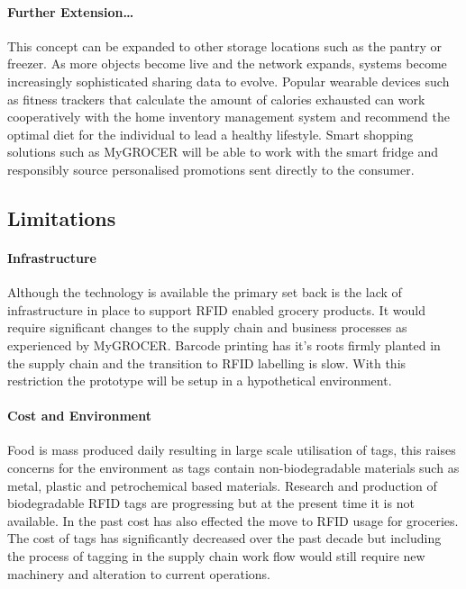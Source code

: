 \documentclass[a4paper, 11pt]{article}
\begin{document}
{\paragraph{Further Extension\dots} This concept can be expanded to other storage locations such as the pantry or freezer. As more objects become live and the network expands, systems become increasingly sophisticated sharing data to evolve. Popular wearable devices such as fitness trackers that calculate the amount of calories exhausted can work cooperatively with the home inventory management system and recommend the optimal diet for the individual to lead a healthy lifestyle. Smart shopping solutions such as MyGROCER\cite{myGrocer} will be able to work with the smart fridge and responsibly source personalised promotions sent directly to the consumer.

\vspace{\baselineskip}
\vspace{\baselineskip}
\vspace{\baselineskip}

\subsection{Limitations}

\paragraph{Infrastructure}Although the technology is available the primary set back is the lack of infrastructure in place to support RFID enabled grocery products. It would require significant changes to the supply chain and business processes \cite{pervasiveComp} as experienced by MyGROCER. Barcode printing has it's roots firmly planted in the supply chain and the transition to RFID labelling is slow. With this restriction the prototype will be setup in a hypothetical environment.

\paragraph{Cost and Environment}Food is mass produced daily resulting in large scale utilisation of tags, this raises concerns for the environment as tags contain non-biodegradable materials such as metal, plastic and petrochemical based materials.\cite{bioTags} Research and production of biodegradable RFID tags are progressing but at the present time it is not available. In the past cost has also effected the move to RFID usage for groceries. The cost of tags has significantly decreased over the past decade but including the process of tagging in the supply chain work flow would still require new machinery and alteration to current operations. 

}
\end{document}
